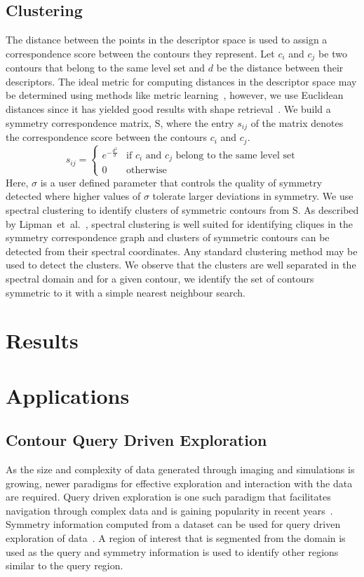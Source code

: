 \documentclass[review,journal]{vgtc}         %
\begin{document}
\subsection{Clustering}\label{clust}
The distance between the points in the descriptor space is used to assign 
a correspondence score between the contours they represent. Let $c_i$
and $c_j$ be two contours that belong to the same level set and $d$ be
the distance between their descriptors. The ideal metric for computing
distances in the descriptor space may be determined using methods like
metric learning~\cite{Kulis13}, however, we use
Euclidean distances since it has yielded good results with shape 
retrieval~\cite{reuter2006laplace,lian2013}. We build a symmetry
correspondence matrix, $\mathrm{S}$, where the entry $s_{ij}$ of the
matrix denotes the correspondence score between the contours $c_i$
and $c_j$.
$$s_{ij} = 
\begin{cases}
	e^{-\frac{d^2}{\sigma}} & \text{if $c_i$ and $c_j$ belong to the same level set}\\
	0 & \text{otherwise}
\end{cases}
$$
Here, $\sigma$ is a user defined parameter that controls the quality of symmetry detected
where higher values of $\sigma$ tolerate larger deviations in symmetry. We use spectral clustering
to identify clusters of symmetric contours from $\mathrm{S}$. As described by 
Lipman~et~al.~\cite{Lip10}, spectral clustering is well suited for identifying
cliques in the symmetry correspondence graph and clusters of symmetric
contours can be detected from their spectral coordinates. Any standard clustering
method may be used to detect the clusters. We observe that the clusters
are well separated in the spectral domain and for a given contour, we identify
the set of contours symmetric to it with a simple nearest neighbour search.
\section{Results}
\section{Applications}
\subsection{Contour Query Driven Exploration}
As the size and complexity of data generated through imaging and simulations
is growing, newer paradigms for effective exploration and interaction with
the data are required. Query driven exploration is one such paradigm that
facilitates navigation through complex data and is gaining popularity in recent
years~\cite{}. Symmetry information computed from a dataset can be used for query
driven exploration of data~\cite{}. A region of interest that is segmented from 
the domain is used as the query and symmetry information is used to identify
other regions similar to the query region. 
\end{document}
